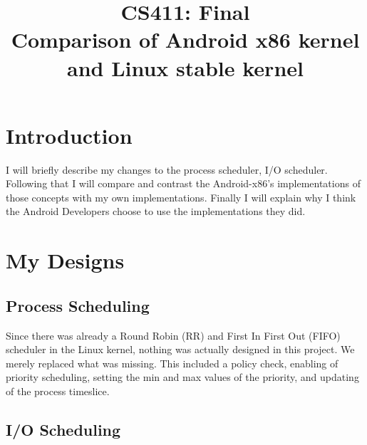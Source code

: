 \documentclass[letterpaper,10pt,titlepage]{article}
\title{CS411: Final\\
    Comparison of Android x86 kernel and Linux stable kernel}
\author{\name}
\begin{document}
\maketitle


%
%
%
% 
% 

\section{Introduction}

I will briefly describe my changes to the process scheduler,  I/O
scheduler. Following that I will compare and contrast the Android-x86's
implementations of those concepts with my own implementations. Finally I
will explain why I think the Android Developers choose to use the
implementations they did.

\section{My Designs}
\subsection*{Process Scheduling}

Since there was already a Round Robin (RR) and First In First Out (FIFO) scheduler
in the Linux kernel, nothing was actually designed in this project. We
merely replaced what was missing. This included a policy check, enabling
of priority scheduling, setting the min and max values of the
priority, and updating of the process timeslice.

\subsection*{I/O Scheduling}
\end{document}
